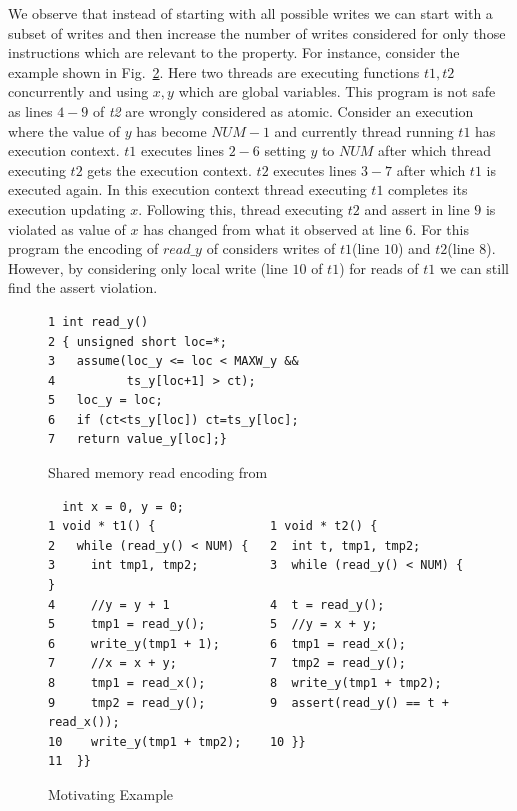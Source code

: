 \documentclass{llncs}
\begin{document}
We observe that instead of starting with all possible writes we can start with a subset of writes and then increase the number of writes considered for only those instructions which are relevant to the property. For instance, consider the example shown in Fig.~\ref{code:motivate}. Here two threads are executing functions \textit{$t1,t2$} concurrently and using \textit{$x,y$} which are global variables. This program is not safe as lines \textit{$4-9$} of \textit{t2} are wrongly considered as atomic. Consider an execution where the value of \textit{$y$} has become \textit{$NUM-1$} and currently thread running \textit{$t1$} has execution context. \textit{$t1$} executes lines \textit{$2-6$} setting \textit{$y$} to \textit{$NUM$} after which thread executing \textit{$t2$} gets the execution context. \textit{$t2$} executes lines \textit{$3-7$} after which \textit{$t1$} is executed again. In this execution context thread executing \textit{$t1$} completes its execution updating \textit{$x$}. Following this, thread executing \textit{$t2$} and assert in line \textit{$9$} is violated as value of \textit{$x$} has changed from what it observed at line \textit{$6$}. For this program the encoding of \textit{$read\_y$} of \cite{anand} considers writes of \textit{$t1$}(line \textit{$10$}) and \textit{$t2$}(line \textit{$8$}). However, by considering only local write (line \textit{$10$} of \textit{$t1$}) for reads of \textit{$t1$} we can still find the assert violation. 
%
\medskip
\noindent
\label{code:anand_read}
\begin{figure}
\begin{verbatim}
1 int read_y() 
2 { unsigned short loc=*;
3   assume(loc_y <= loc < MAXW_y &&
4          ts_y[loc+1] > ct);
5   loc_y = loc;
6   if (ct<ts_y[loc]) ct=ts_y[loc];
7   return value_y[loc];}
\end{verbatim}
\caption{Shared memory read encoding from \cite{anand}}
\label{code:anand_enc}
\end{figure}
%
\noindent
\begin{figure}
\begin{verbatim}
  int x = 0, y = 0;
1 void * t1() {                1 void * t2() {
2   while (read_y() < NUM) {   2  int t, tmp1, tmp2;
3     int tmp1, tmp2;          3  while (read_y() < NUM) { }
4     //y = y + 1              4  t = read_y();
5     tmp1 = read_y();         5  //y = x + y;
6     write_y(tmp1 + 1);       6  tmp1 = read_x();
7     //x = x + y;             7  tmp2 = read_y();
8     tmp1 = read_x();         8  write_y(tmp1 + tmp2);
9     tmp2 = read_y();         9  assert(read_y() == t + read_x());  
10    write_y(tmp1 + tmp2);    10 }}
11  }}
\end{verbatim}
\caption{Motivating Example}
\label{code:motivate}
\end{figure}
%
\end{document}
